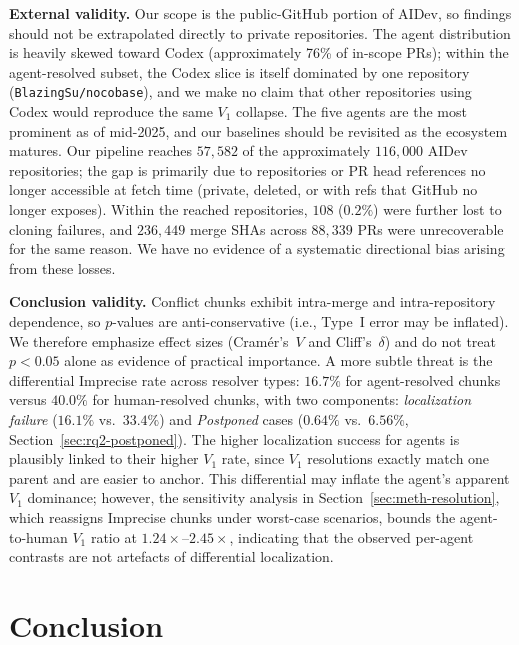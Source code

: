 \documentclass[sigconf,anonymous]{acmart}
\begin{document}
\textbf{External validity.} Our scope is the public-GitHub portion of AIDev, so findings should not be extrapolated directly to private repositories. The agent distribution is heavily skewed toward Codex (approximately 76\% of in-scope PRs); within the agent-resolved subset, the Codex slice is itself dominated by one repository (\texttt{BlazingSu/nocobase}), and we make no claim that other repositories using Codex would reproduce the same $V_1$ collapse. The five agents are the most prominent as of mid-2025, and our baselines should be revisited as the ecosystem matures. Our pipeline reaches $57{,}582$ of the approximately $116{,}000$ AIDev repositories; the gap is primarily due to repositories or PR head references no longer accessible at fetch time (private, deleted, or with refs that GitHub no longer exposes). Within the reached repositories, $108$ ($0.2\%$) were further lost to cloning failures, and $236{,}449$ merge SHAs across $88{,}339$ PRs were unrecoverable for the same reason. We have no evidence of a systematic directional bias arising from these losses.

\textbf{Conclusion validity.} Conflict chunks exhibit intra-merge and intra-repository dependence, so $p$-values are anti-conservative (i.e., Type~I error may be inflated). We therefore emphasize effect sizes (Cram\'{e}r's~$V$ and Cliff's~$\delta$) and do not treat $p{<}0.05$ alone as evidence of practical importance. A more subtle threat is the differential Imprecise rate across resolver types: $16.7\%$ for agent-resolved chunks versus $40.0\%$ for human-resolved chunks, with two components: \emph{localization failure} ($16.1\%$ vs.\ $33.4\%$) and \emph{Postponed} cases ($0.64\%$ vs.\ $6.56\%$, Section~\ref{sec:rq2-postponed}). The higher localization success for agents is plausibly linked to their higher $V_1$ rate, since $V_1$ resolutions exactly match one parent and are easier to anchor. This differential may inflate the agent's apparent $V_1$ dominance; however, the sensitivity analysis in Section~\ref{sec:meth-resolution}, which reassigns Imprecise chunks under worst-case scenarios, bounds the agent-to-human $V_1$ ratio at $1.24{\times}$--$2.45{\times}$, indicating that the observed per-agent contrasts are not artefacts of differential localization.

\section{Conclusion}
\label{sec:conclusion}
\end{document}
